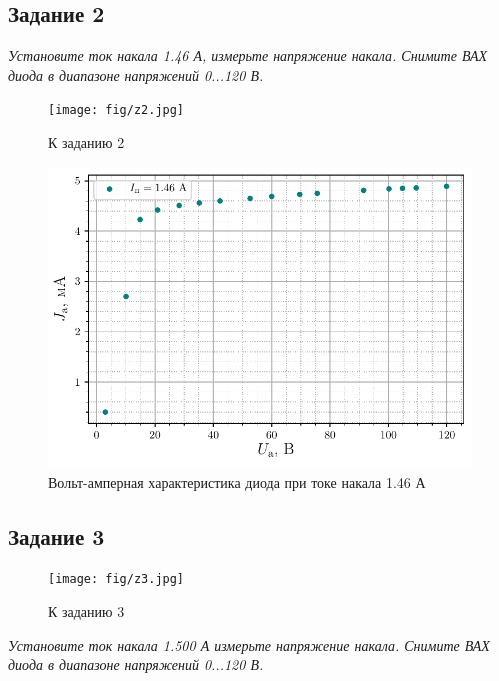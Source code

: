 \subsection{Задание 2}
\textit{Установите ток накала 1.46 А, измерьте напряжение накала. Снимите ВАХ
диода в диапазоне напряжений 0...120 В.}

\begin{figure}[H]
	\centering
	\texttt{[image: fig/z2.jpg]}
	\caption{К заданию 2}
	\label{fig:14}
\end{figure}


\begin{figure}[H]
	\centering
    \includegraphics[scale=1]{scripts/fig2}
	\caption{Вольт-амперная характеристика диода при токе накала 1.46 А}
	\label{fig:15}
\end{figure}

\subsection{Задание 3}

\begin{figure}[h!]
	\centering
	\texttt{[image: fig/z3.jpg]}
	\caption{К заданию 3}
	\label{fig:16}
\end{figure}

\textit{Установите ток накала 1.500 А измерьте напряжение накала. Снимите ВАХ
диода в диапазоне напряжений 0...120 В.}


